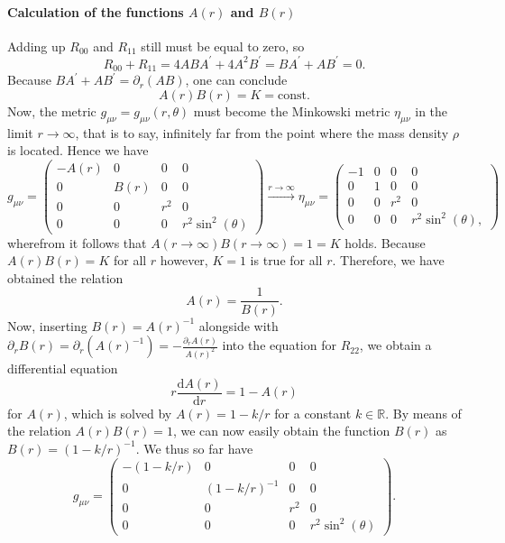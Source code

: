 \documentclass[a4paper,11pt]{article}
\numberwithin{equation}{section}
\begin{document}
{\paragraph{Calculation of the functions $A(r)$ and $B(r)$} Adding up $R_{00}$ and $R_{11}$ still must be equal to zero, so \begin{equation}
R_{00} + R_{11} = 4ABA^\prime + 4A^2B^\prime = BA^\prime + AB^\prime = 0.
\end{equation} Because $BA^\prime + AB^\prime = \partial_r(AB)$, one can conclude \begin{equation}
A(r)B(r) = K = \text{const.}
\end{equation} Now, the metric $g_{\mu\nu} = g_{\mu\nu}(r,\theta)$ must become the Minkowski metric $\eta_{\mu\nu}$ in the limit $r\rightarrow \infty$, that is to say, infinitely far from the point where the mass density $\rho$ is located. Hence we have \begin{equation}
g_{\mu\nu} = \begin{pmatrix}
	-A(r) & 0 & 0 & 0 \\
	0 & B(r) & 0 & 0 \\
	0 & 0 & r^2 & 0 \\
	0 & 0 & 0 & r^2\sin^2(\theta)
\end{pmatrix} \xrightarrow{r\rightarrow \infty} \eta_{\mu\nu} = \begin{pmatrix}
-1 & 0 & 0 & 0 \\
0 & 1 & 0 & 0 \\
0 & 0 & r^2 & 0 \\
0 & 0 & 0 & r^2\sin^2(\theta),
\end{pmatrix}
\end{equation} wherefrom it follows that $A(r\rightarrow \infty)B(r\rightarrow \infty) = 1 = K$ holds. Because $A(r)B(r) = K$ for all $r$ however, $K=1$ is true for all $r$. Therefore, we have obtained the relation \begin{equation}
A(r) = \frac{1}{B(r)}.
\end{equation} Now, inserting $B(r) = A(r)^{-1}$ alongside with $\partial_rB(r) = \partial_r(A(r)^{-1}) = -\frac{\partial_r A(r)}{A(r)^2}$ into the equation for $R_{22}$, we obtain a differential equation \begin{equation}
r\frac{\mathrm{d} A(r)}{\mathrm{d}r} = 1-A(r)
\end{equation} for $A(r)$, which is solved by $A(r) = 1-k/r$ for a constant $k \in \mathbb{R}$. By means of the relation $A(r)B(r) = 1$, we can now easily obtain the function $B(r)$ as $B(r) = (1-k/r)^{-1}$. We thus so far have \begin{equation}
g_{\mu\nu} = \begin{pmatrix}
	-(1-k/r) & 0 & 0 & 0 \\
	0 & (1-k/r)^{-1} & 0 & 0 \\
	0 & 0 & r^2 & 0 \\
	0 & 0 & 0 & r^2\sin^2(\theta)
\end{pmatrix}.
\end{equation}

}
\end{document}
